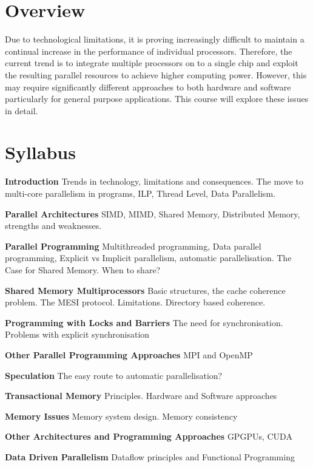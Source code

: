 \section*{Overview}

Due to technological limitations, it is proving increasingly difficult to
maintain a continual increase in the performance of individual processors.
Therefore, the current trend is to integrate multiple processors on to a single
chip and exploit the resulting parallel resources to achieve higher computing
power. However, this may require significantly different approaches to both
hardware and software particularly for general purpose applications. This course
will explore these issues in detail.

\section*{Syllabus}
\begin{mymulticols}
\begin{description}
\item{\textbf{Introduction}} Trends in technology, limitations and consequences. The move to multi-core parallelism in programs, ILP, Thread Level, Data Parallelism.
\item{\textbf{Parallel Architectures}} SIMD, MIMD, Shared Memory, Distributed Memory, strengths and weaknesses.
\item{\textbf{Parallel Programming}} Multithreaded programming, Data parallel programming, Explicit vs Implicit parallelism, automatic parallelisation. The Case for Shared Memory. When to share?
\item{\textbf{Shared Memory Multiprocessors}} Basic structures, the cache coherence problem. The MESI protocol. Limitations. Directory based coherence.
\item{\textbf{Programming with Locks and Barriers}} The need for synchronisation. Problems with explicit synchronisation
\item{\textbf{Other Parallel Programming Approaches}} MPI and OpenMP
\item{\textbf{Speculation}} The easy route to automatic parallelisation?
\item{\textbf{Transactional Memory}} Principles. Hardware and Software approaches
\item{\textbf{Memory Issues}} Memory system design. Memory consistency
\item{\textbf{Other Architectures and Programming Approaches}}
GPGPUs, CUDA
\item{\textbf{Data Driven Parallelism}} Dataflow principles and Functional Programming
\end{description}
\end{mymulticols}


